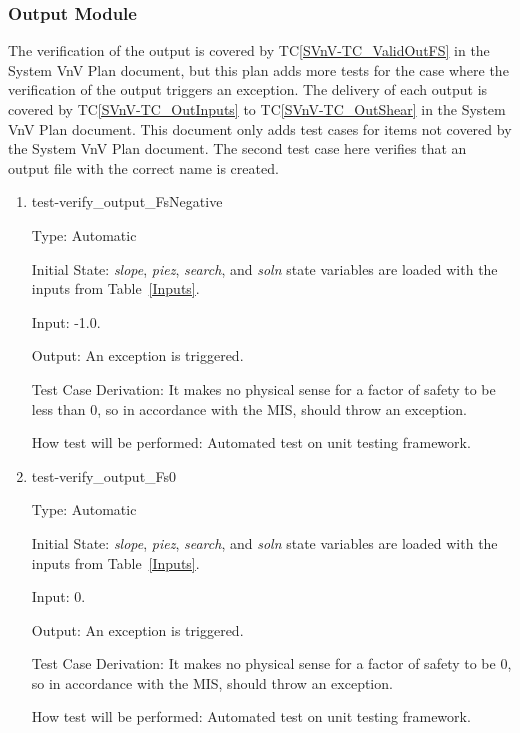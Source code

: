 \documentclass[12pt, titlepage]{article}
\newcommand{\tcref}[1]{TC\ref{#1}}
\newcounter{utestnum} %
\begin{document}
\subsubsection{Output Module}
The verification of the output is covered by \tcref{SVnV-TC_ValidOutFS} in the 
System VnV Plan document, but this plan adds more tests for the case where the 
verification of the output triggers an exception. The delivery of each output 
is covered by 
\tcref{SVnV-TC_OutInputs} to \tcref{SVnV-TC_OutShear} in the System VnV Plan 
document. This document only adds test cases for items not covered by 
the System VnV Plan document. The second test case here verifies that an output 
file with the correct name is created.

\begin{enumerate}[label=TC\arabic*:,ref={\arabic*}]
	
	\item [TC\refstepcounter{utestnum}\theutestnum: \label{TC_InvalidFs}] 
	test-verify\_output\_FsNegative
	
	Type: Automatic
	
	Initial State: \textit{slope}, \textit{piez}, \textit{search}, and 
	\textit{soln} state variables are loaded with the inputs from 
	Table~\ref{Inputs}.
	
	Input: -1.0.
	
	Output: An exception is triggered.
	
	Test Case Derivation: It makes no physical sense for a factor of safety to 
	be less than 0, so in accordance with the MIS, \progname{} should throw an 
	exception.
	
	How test will be performed: Automated test on unit testing framework.
	
	\item [TC\refstepcounter{utestnum}\theutestnum: \label{TC_InvalidFs0}] 
	test-verify\_output\_Fs0
	
	Type: Automatic
	
	Initial State: \textit{slope}, \textit{piez}, \textit{search}, and 
	\textit{soln} state variables are loaded with the inputs from 
	Table~\ref{Inputs}.
	
	Input: 0.
	
	Output: An exception is triggered.
	
	Test Case Derivation: It makes no physical sense for a factor of safety to 
	be 0, so in accordance with the MIS, \progname{} should throw an exception.
	
	How test will be performed: Automated test on unit testing framework.
	

\end{enumerate}
\end{document}
